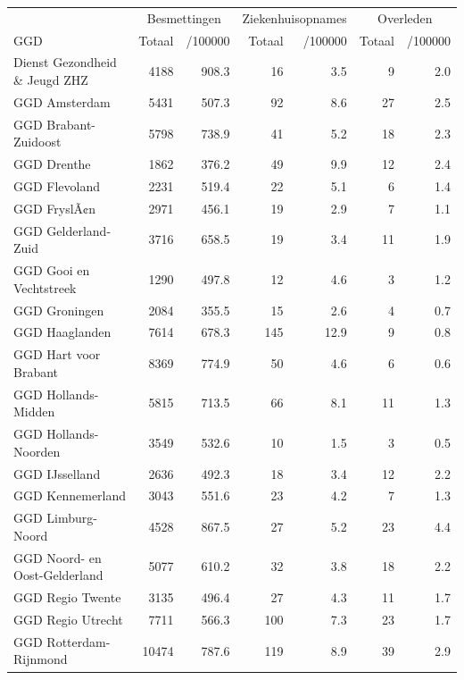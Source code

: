 \documentclass[
  english,
  man,floatsintext]{apa6}
\begin{document}
\begin{table}
\centering\begingroup\fontsize{10}{12}\selectfont

\begin{threeparttable}
\begin{tabular}{lrrrrrr}
\toprule
\multicolumn{1}{c}{ } & \multicolumn{2}{c}{Besmettingen} & \multicolumn{2}{c}{Ziekenhuisopnames} & \multicolumn{2}{c}{Overleden} \\
\cmidrule(l{3pt}r{3pt}){2-3} \cmidrule(l{3pt}r{3pt}){4-5} \cmidrule(l{3pt}r{3pt}){6-7}
GGD & Totaal & /100000 & Totaal & /100000 & Totaal & /100000\\
\midrule
Dienst Gezondheid \& Jeugd ZHZ & 4188 & 908.3 & 16 & 3.5 & 9 & 2.0\\
GGD Amsterdam & 5431 & 507.3 & 92 & 8.6 & 27 & 2.5\\
GGD Brabant-Zuidoost & 5798 & 738.9 & 41 & 5.2 & 18 & 2.3\\
GGD Drenthe & 1862 & 376.2 & 49 & 9.9 & 12 & 2.4\\
GGD Flevoland & 2231 & 519.4 & 22 & 5.1 & 6 & 1.4\\
GGD FryslÃ¢n & 2971 & 456.1 & 19 & 2.9 & 7 & 1.1\\
GGD Gelderland-Zuid & 3716 & 658.5 & 19 & 3.4 & 11 & 1.9\\
GGD Gooi en Vechtstreek & 1290 & 497.8 & 12 & 4.6 & 3 & 1.2\\
GGD Groningen & 2084 & 355.5 & 15 & 2.6 & 4 & 0.7\\
GGD Haaglanden & 7614 & 678.3 & 145 & 12.9 & 9 & 0.8\\
GGD Hart voor Brabant & 8369 & 774.9 & 50 & 4.6 & 6 & 0.6\\
GGD Hollands-Midden & 5815 & 713.5 & 66 & 8.1 & 11 & 1.3\\
GGD Hollands-Noorden & 3549 & 532.6 & 10 & 1.5 & 3 & 0.5\\
GGD IJsselland & 2636 & 492.3 & 18 & 3.4 & 12 & 2.2\\
GGD Kennemerland & 3043 & 551.6 & 23 & 4.2 & 7 & 1.3\\
GGD Limburg-Noord & 4528 & 867.5 & 27 & 5.2 & 23 & 4.4\\
GGD Noord- en Oost-Gelderland & 5077 & 610.2 & 32 & 3.8 & 18 & 2.2\\
GGD Regio Twente & 3135 & 496.4 & 27 & 4.3 & 11 & 1.7\\
GGD Regio Utrecht & 7711 & 566.3 & 100 & 7.3 & 23 & 1.7\\
GGD Rotterdam-Rijnmond & 10474 & 787.6 & 119 & 8.9 & 39 & 2.9\\

\end{tabular}
\end{threeparttable}
\end{table}
\end{document}
